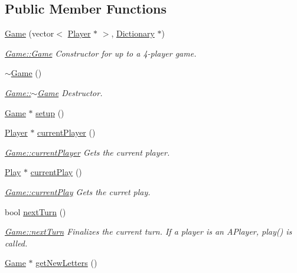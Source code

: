 \subsection*{Public Member Functions}
\begin{DoxyCompactItemize}
\item 
\hyperlink{class_game_ab1f8c81ce4221a80b7a27320e92ebaed}{Game} (vector$<$ \hyperlink{class_player}{Player} $\ast$ $>$, \hyperlink{class_dictionary}{Dictionary} $\ast$)
\begin{DoxyCompactList}\small\item\em \hyperlink{class_game_ab1f8c81ce4221a80b7a27320e92ebaed}{Game\-::\-Game} Constructor for up to a 4-\/player game. \end{DoxyCompactList}\item 
\hyperlink{class_game_ae3d112ca6e0e55150d2fdbc704474530}{$\sim$\-Game} ()
\begin{DoxyCompactList}\small\item\em \hyperlink{class_game_ae3d112ca6e0e55150d2fdbc704474530}{Game\-::$\sim$\-Game} Destructor. \end{DoxyCompactList}\item 
\hyperlink{class_game}{Game} $\ast$ \hyperlink{class_game_a62edc885b560e752b04fa64c5a481874}{setup} ()
\item 
\hyperlink{class_player}{Player} $\ast$ \hyperlink{class_game_a7cdf3f086fafd3234dba20409e9b98d3}{current\-Player} ()
\begin{DoxyCompactList}\small\item\em \hyperlink{class_game_a7cdf3f086fafd3234dba20409e9b98d3}{Game\-::current\-Player} Gets the current player. \end{DoxyCompactList}\item 
\hyperlink{class_play}{Play} $\ast$ \hyperlink{class_game_acba299674208d186660ed4a88e58d967}{current\-Play} ()
\begin{DoxyCompactList}\small\item\em \hyperlink{class_game_acba299674208d186660ed4a88e58d967}{Game\-::current\-Play} Gets the curret play. \end{DoxyCompactList}\item 
bool \hyperlink{class_game_a6ec161629afa5e24452040bb620eb4bb}{next\-Turn} ()
\begin{DoxyCompactList}\small\item\em \hyperlink{class_game_a6ec161629afa5e24452040bb620eb4bb}{Game\-::next\-Turn} Finalizes the current turn. If a player is an A\-Player, play() is called. \end{DoxyCompactList}\item 
\hyperlink{class_game}{Game} $\ast$ \hyperlink{class_game_a19604b02effa3de3b4157f955c9cea59}{get\-New\-Letters} ()
\end{DoxyCompactItemize}
